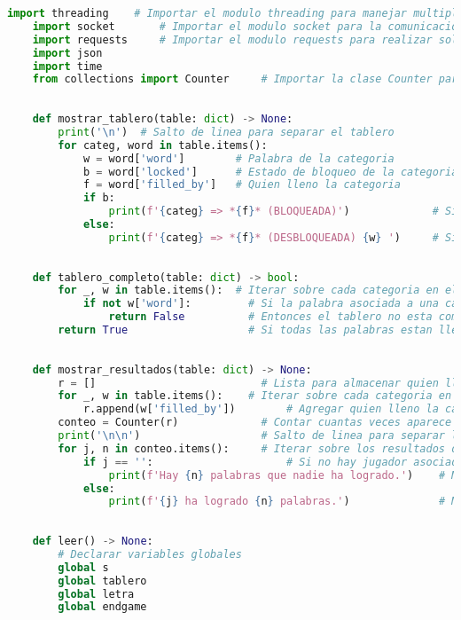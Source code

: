 \documentclass{article}
\begin{document}
\begin{lstlisting}[language=Python, caption={Código Python}, label={lst:python_code}]
    import threading    # Importar el modulo threading para manejar multiples hilos de ejecucion
    import socket       # Importar el modulo socket para la comunicacion de red
    import requests     # Importar el modulo requests para realizar solicitudes HTTP
    import json
    import time
    from collections import Counter     # Importar la clase Counter para contar elementos
    
    
    def mostrar_tablero(table: dict) -> None:
        print('\n')  # Salto de linea para separar el tablero
        for categ, word in table.items():
            w = word['word']        # Palabra de la categoria
            b = word['locked']      # Estado de bloqueo de la categoria
            f = word['filled_by']   # Quien lleno la categoria
            if b:
                print(f'{categ} => *{f}* (BLOQUEADA)')             # Si la categoria esta bloqueada
            else:
                print(f'{categ} => *{f}* (DESBLOQUEADA) {w} ')     # Si la categoria no esta bloqueada
    
    
    def tablero_completo(table: dict) -> bool:
        for _, w in table.items():  # Iterar sobre cada categoria en el tablero
            if not w['word']:         # Si la palabra asociada a una categoria esta vacia
                return False          # Entonces el tablero no esta completo
        return True                   # Si todas las palabras estan llenas, el tablero esta completo
    
    
    def mostrar_resultados(table: dict) -> None:
        r = []                          # Lista para almacenar quien lleno cada categoria
        for _, w in table.items():    # Iterar sobre cada categoria en el tablero
            r.append(w['filled_by'])        # Agregar quien lleno la categoria a la lista
        conteo = Counter(r)             # Contar cuantas veces aparece cada jugador en la lista
        print('\n\n')                   # Salto de linea para separar los resultados
        for j, n in conteo.items():     # Iterar sobre los resultados del conteo
            if j == '':                     # Si no hay jugador asociado
                print(f'Hay {n} palabras que nadie ha logrado.')    # Mostrar el numero de palabras sin jugador asociado
            else:
                print(f'{j} ha logrado {n} palabras.')              # Mostrar el numero de palabras logrado por el jugador
    
    
    def leer() -> None:
        # Declarar variables globales
        global s
        global tablero
        global letra
        global endgame
    

\end{lstlisting}
\end{document}

